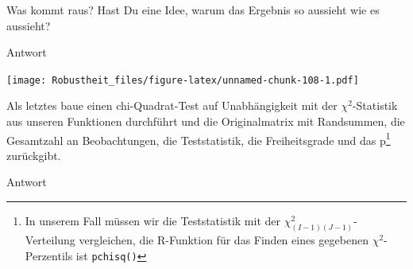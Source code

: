 \documentclass[
]{book}
\newenvironment{Shaded}{\begin{snugshade}}{\end{snugshade}}
\newcommand{\AttributeTok}[1]{\textcolor[rgb]{0.77,0.63,0.00}{#1}}
\newcommand{\DecValTok}[1]{\textcolor[rgb]{0.00,0.00,0.81}{#1}}
\newcommand{\FunctionTok}[1]{\textcolor[rgb]{0.00,0.00,0.00}{#1}}
\newcommand{\NormalTok}[1]{#1}
\newcommand{\OtherTok}[1]{\textcolor[rgb]{0.56,0.35,0.01}{#1}}
\newcommand{\SpecialCharTok}[1]{\textcolor[rgb]{0.00,0.00,0.00}{#1}}
\newcommand{\StringTok}[1]{\textcolor[rgb]{0.31,0.60,0.02}{#1}}
\begin{document}
Was kommt raus?
Hast Du eine Idee, warum das Ergebnis so aussieht wie es aussieht?

Antwort

\begin{Shaded}
\end{Shaded}

\texttt{[image: Robustheit\_files/figure-latex/unnamed-chunk-108-1.pdf]}

Als letztes baue einen chi-Quadrat-Test auf Unabhängigkeit mit der \(\chi^2\)-Statistik aus unseren Funktionen durchführt und die Originalmatrix mit Randsummen, die Gesamtzahl an Beobachtungen, die Teststatistik, die Freiheitsgrade und das p\footnote{In unserem Fall müssen wir die Teststatistik mit der \(\chi^2_{(I-1)(J-1)}\)-Verteilung vergleichen, die R-Funktion für das Finden eines gegebenen \(\chi^2\)-Perzentils ist \texttt{pchisq()}} zurückgibt.

Antwort
\end{document}
